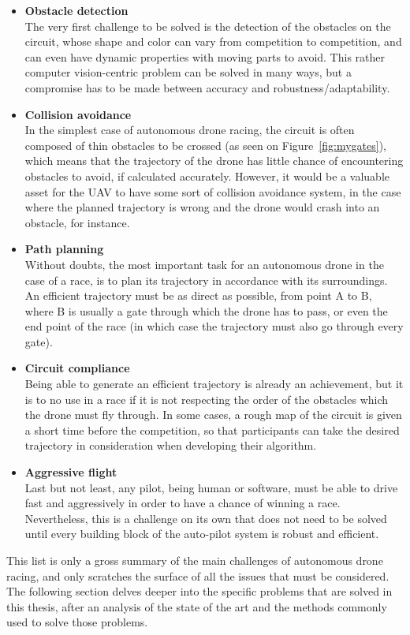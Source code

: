 \begin{itemize}
	\item{\textbf{Obstacle detection\\}
		The very first challenge to be solved is the detection of the obstacles
		on the circuit, whose shape and color can vary from competition to
		competition, and can even have dynamic properties with moving parts to
		avoid. This rather computer vision-centric problem can be solved
		in many ways, but a compromise has to be made between accuracy and
		robustness/adaptability.
	}
	\item{\textbf{Collision avoidance\\}
		In the simplest case of autonomous drone racing, the circuit is often
		composed of thin obstacles to be crossed (as seen on
		Figure~\ref{fig:mygates}), which means that the trajectory of the drone
		has little chance of encountering obstacles to avoid, if calculated
		accurately. However, it would be a valuable asset for the UAV to have
		some sort of collision avoidance system, in the case where the planned
		trajectory is wrong and the drone would crash into an obstacle, for
		instance.
	}
	\item{\textbf{Path planning\\}
		Without doubts, the most important task for an autonomous drone in the
		case of a race, is to plan its trajectory in accordance with its
		surroundings. An efficient trajectory must be as direct as possible,
		from point A to B, where B is usually a gate through which the drone
		has to pass, or even the end point of the race (in which case the
		trajectory must also go through every gate).
	}
	\item{\textbf{Circuit compliance\\}
		Being able to generate an efficient trajectory is already an
		achievement, but it is to no use in a race if it is not respecting the
		order of the obstacles which the drone must fly through. In some cases,
		a rough map of the circuit is given a short time before the
		competition, so that participants can take the desired trajectory in
		consideration when developing their algorithm.
	}
	\item{\textbf{Aggressive flight\\}
		Last but not least, any pilot, being human or software, must be able to
		drive fast and aggressively in order to have a chance of winning a
		race.  Nevertheless, this is a challenge on its own that does not need
		to be solved until every building block of the auto-pilot system is
		robust and efficient.\\
	}
\end{itemize}

This list is only a gross summary of the main challenges of autonomous drone
racing, and only scratches the surface of all the issues that must be
considered. The following section delves deeper into the specific problems
that are solved in this thesis, after an analysis of the state of the art and
the methods commonly used to solve those problems.

